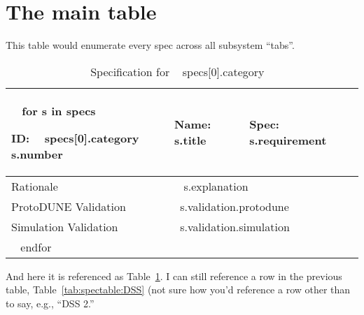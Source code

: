 \documentclass{article}
\begin{document}
\section{The main table}

This table would enumerate every spec across all subsystem ``tabs''.


\begin{table}[htp]
  \caption{Specification for ~{{ specs[0].category }}~}
  \centering
  \begin{tabular}{ |l|p{}|p{}| }
    \hline
        ~{ for s in specs }~

    \rowcolor{dunetablecolor}
ID:  ~{{ specs[0].category }}~ ~{{ s.number }}~   & Name: ~{{ s.title }}~  & Spec:  ~{{ s.requirement }}~ \\
    \hline
    Rationale &  \multicolumn{2}{p{0.7\textwidth}|}{ ~{{ s.explanation }}~ } \\
    \hline
ProtoDUNE Validation & \multicolumn{2}{p{0.7\textwidth}|}{ ~{{s.validation.protodune}}~ } \\
    \hline
Simulation Validation & \multicolumn{2}{p{0.7\textwidth}|}{ ~{{s.validation.simulation}}~ } \\
        \hline
   ~{ endfor }~

 
  \end{tabular}
  \label{tab:spectable:~{{ specs[0].category }}~}
\end{table}


And here it is referenced as Table~\ref{tab:spectable:~{{ specs[0].category }}~}.  
I can still reference a row in the previous table,
Table~\ref{tab:spectable:DSS} (not sure how you'd reference a row other than to say, e.g., ``DSS 2.''
\end{document}
